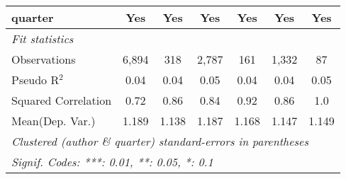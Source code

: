 \begin{tabular}{lcccccc}
   quarter                                                    & Yes           & Yes           & Yes     & Yes            & Yes          & Yes\\  
   \midrule
   \emph{Fit statistics}\\
   Observations                                               & 6,894         & 318           & 2,787   & 161            & 1,332        & 87\\  
   Pseudo R$^2$                                               & 0.04          & 0.04          & 0.05    & 0.04           & 0.04         & 0.05\\  
   Squared Correlation                                        & 0.72          & 0.86          & 0.84    & 0.92           & 0.86         & 1.0\\  
Mean(Dep. Var.) & 1.189 & 1.138 & 1.187 & 1.168 & 1.147 & 1.149 \\
   \midrule \midrule
   \multicolumn{7}{l}{\emph{Clustered (author \& quarter) standard-errors in parentheses}}\\
   \multicolumn{7}{l}{\emph{Signif. Codes: ***: 0.01, **: 0.05, *: 0.1}}\\
\end{tabular}
\par\endgroup
